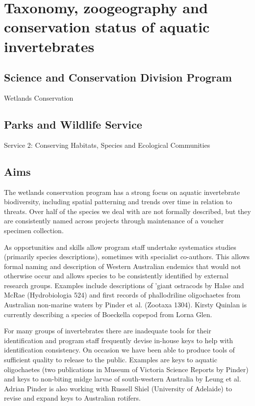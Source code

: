 \documentclass[version=last,
    paper=a4, %
    10pt, %
    usenames,
    dvipsnames,
    oneside, %
    headings=openany, %
    DIV=15 %
]{scrbook}
\begin{document}
\section*{Taxonomy, zoogeography and conservation status of aquatic invertebrates
}



\subsection*{Science and Conservation Division Program}

Wetlands Conservation




\subsection*{Parks and Wildlife Service}

Service 2: Conserving Habitats, Species and Ecological Communities




\subsection*{Aims}

The wetlands conservation program has a strong focus on aquatic
invertebrate biodiversity, including spatial patterning and trends over
time in relation to threats. Over half of the species we deal with are
not formally described, but they are consistently named across projects
through maintenance of a voucher specimen collection.

As opportunities and skills allow program staff undertake systematics
studies (primarily species descriptions), sometimes with specialist
co-authors. This allows formal naming and description of Western
Australian endemics that would not otherwise occur and allows species to
be consistently identified by external research groups. Examples include
descriptions of 'giant ostracods by Halse and McRae (Hydrobiologia 524)
and first records of phallodriline oligochaetes from Australian
non-marine waters by Pinder et al. (Zootaxa 1304). Kirsty Quinlan is
currently describing a species of Boeckella copepod from Lorna Glen.

For many groups of invertebrates there are inadequate tools for their
identification and program staff frequently devise in-house keys to help
with identification consistency. On occasion we have been able to
produce tools of sufficient quality to release to the public. Examples
are keys to aquatic oligochaetes (two publications in Museum of Victoria
Science Reports by Pinder) and keys to non-biting midge larvae of
south-western Australia by Leung et al. Adrian Pinder is also working
with Russell Shiel (University of Adelaide) to revise and expand keys to
Australian rotifers.
\end{document}
